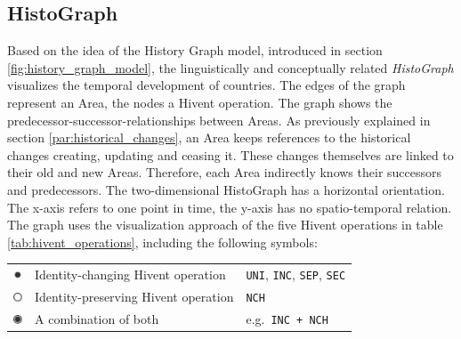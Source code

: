 
\subsection{HistoGraph} %
\label{sub:histograph}

Based on the idea of the History Graph model, introduced in section \ref{fig:history_graph_model}, the linguistically and conceptually related \emph{HistoGraph} visualizes the temporal development of countries. The edges of the graph represent an Area, the nodes a Hivent operation. The graph shows the predecessor-successor-relationships between Areas. As previously explained in section \ref{par:historical_changes}, an Area keeps references to the historical changes creating, updating and ceasing it. These changes themselves are linked to their old and new Areas. Therefore, each Area indirectly knows their successors and predecessors. The two-dimensional HistoGraph has a horizontal orientation. The x-axis refers to one point in time, the y-axis has no spatio-temporal relation. The graph uses the visualization approach of the five Hivent operations in table \ref{tab:hivent_operations}, including the following symbols:

\begin{table}[H]
\begin{center}
\begin{tabular}{c l l}

  \raisebox{3.5\height}

  \raisebox{-0.2\height}
  {\includegraphics[width=10px]{graphics/development/hivent_model/histograph/circle_filled}}
  & Identity-changing Hivent operation
  & \texttt{UNI}, \texttt{INC}, \texttt{SEP}, \texttt{SEC} \\

  \raisebox{-0.2\height}
  {\includegraphics[width=10px]{graphics/development/hivent_model/histograph/circle_unfilled}}
  & Identity-preserving Hivent operation
  & \texttt{NCH} \\

  \raisebox{-0.2\height}
  {\includegraphics[width=10px]{graphics/development/hivent_model/histograph/circle_combo}}
  & A combination of both
  & e.g.\ \texttt{INC + NCH}

\end{tabular}
\label{tab:histograph_symbols}
\end{center}
\end{table}

